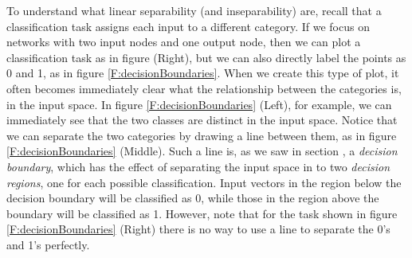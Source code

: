 To understand what linear separability (and inseparability) are, recall that a classification task assigns each input to a different category. If we focus on networks with two input nodes and one output node, then we can plot a classification task as in figure  (Right), but we can also directly label the points as 0 and 1, as in figure \ref{F:decisionBoundaries}. When we create this type of plot, it often becomes immediately clear what the relationship between the categories is, in the input space. In figure \ref{F:decisionBoundaries} (Left), for example, we can immediately see that the two classes are distinct in the input space. Notice that we can separate the two categories by drawing a line between them, as in figure \ref{F:decisionBoundaries} (Middle). Such a line is, as we saw in section , a \emph{decision boundary}, which has the effect of separating the input space in to two \emph{decision regions}, one for each possible classification. Input vectors in the region below the decision boundary will be classified as 0, while those in the region above the boundary will be classified as 1. However, note that for the task shown in figure \ref{F:decisionBoundaries} (Right) there is no way to use a line to separate the 0's and 1's perfectly.

